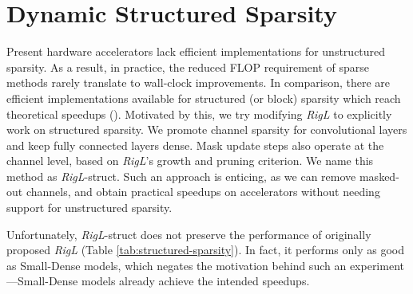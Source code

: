 \section{Dynamic Structured Sparsity}\label{structured-sparsity}



Present hardware accelerators lack efficient implementations for unstructured sparsity. As a result, in practice, the reduced FLOP requirement of sparse methods rarely translate to wall-clock improvements. In comparison, there are efficient implementations available for structured (or block) sparsity which reach theoretical speedups (\citet{gray2017gpu,Vooturi_2019_ICCV}). Motivated by this, we try modifying \textit{RigL} to explicitly work on structured sparsity. We promote channel sparsity for convolutional layers and keep fully connected layers dense. Mask update steps also operate at the channel level, based on \textit{RigL}'s growth and pruning criterion. We name this method as \textit{RigL}-struct. Such an approach is enticing, as we can remove masked-out channels, and obtain practical speedups on accelerators without needing support for unstructured sparsity.

Unfortunately, \textit{RigL}-struct does not preserve the performance of originally proposed \textit{RigL} (Table \ref{tab:structured-sparsity}). In fact, it performs only as good as Small-Dense models, which negates the motivation behind such an experiment---Small-Dense models already achieve the intended speedups.
